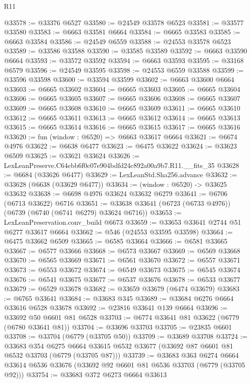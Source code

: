 \begin{lexlean}{R11}
\begin{coremodule}
@33578 := @33376 @6527
@33580 := @24549 @33578 @6523
@33581 := @33577 @33580
@33583 := @6663 @33581 @6664
@33584 := @6665 @33583
@33585 := @6663 @33584
@33586 := @24549 @6559
@33588 := @24553 @33578 @6523
@33589 := @33586 @33588
@33590 := @33585 @33589
@33592 := @6663 @33590 @6664
@33593 := @33572 @33592
@33594 := @6663 @33593
@33595 := @33168 @6579
@33596 := @24549 @33595
@33598 := @24553 @6559 @33588
@33599 := @33596 @33598
@33600 := @33594 @33599
@33602 := @6663 @33600 @6664
@33603 := @6665 @33602
@33604 := @6665 @33603
@33605 := @6665 @33604
@33606 := @6665 @33605
@33607 := @6665 @33606
@33608 := @6665 @33607
@33609 := @6665 @33608
@33610 := @6665 @33609
@33611 := @6665 @33610
@33612 := @6665 @33611
@33613 := @6665 @33612
@33614 := @6665 @33613
@33615 := @6665 @33614
@33616 := @6665 @33615
@33617 := @6665 @33616
@33620 := fun (window : @6520) => @6663 @33617 @6664
@33621 := @6674 @4976
@33622 := @6638 @6477
@33623 := @6475 @33622
@33624 := @33623 @6509
@33625 := @33621 @33624
@33626 := LexLeanPreserve.C64ebb6f0c07e904bdfd24c892a00a9b7.R11.__fits_35
@33628 := @6684 (@33626 @6477)
@33629 := LexLeanStd.Sha256.advance
@33632 := @33628 (@6638 (@33629 @6477))
@33634 := (window : @6520) -> @33625 @33632
@33638 := @6698 @4976 @33624 @33632 @6279
@33641 := @6706 (@6713 @33622) @6716
@33651 := @33638 @33641 (@6723 (@6733 @4976)) (@6739 (@6740 (@6741 @6279) @33624 @6716))
@33653 := LexLeanPreservation.conv_build @6673
@33659 := @33653 @33641 @2744 @51 @6277 @33617 @6664
@33662 := @546 (@24553 @33595 @33598)
@33664 := @6475 @33662 @6509
@33665 := @6585 @33664
@33666 := @6581 @33665
@33667 := @6577 @33666
@33668 := @6573 @33667
@33669 := @6569 @33668
@33670 := @6565 @33669
@33671 := @6561 @33670
@33672 := @6557 @33671
@33673 := @6553 @33672
@33674 := @6549 @33673
@33675 := @6545 @33674
@33676 := @6541 @33675
@33677 := @6537 @33676
@33678 := @6533 @33677
@33679 := @6529 @33678
@33682 := @33659 @33679 (@6474 @33679)
@33683 := @6765 @33641
@33684 := @33683 @345
@33689 := @33684 @6276 @6664 @33616 @6528 @33678
@33692 := @23816 @33641 @139 @6664
@33696 := @33692 @50 @6601 @81 @6528
@33703 := @6774 @33641 @81 @33622 (@6779 (@6780 @33641 @81))
@33704 := @33696 @33703
@33705 := @23835 @6601
@33708 := @33704 (@6779 (@33705 @50))
@33709 := @33689 @33708
@33724 := @33683
    @354
    @6275
    @6664
    @33615
    @6532
    @33677
    (@33692 @87 @6601 @81 @6532 @33703 (@6779 (@33705 @87)))
@33739 := @33683
    @363
    @6274
    @6664
    @33614
    @6536
    @33676
    (@33692 @92 @6601 @81 @6536 @33703 (@6779 (@33705 @92)))
@33754 := @33683
    @372
    @6273
    @6664
    @33613

\end{coremodule}
\end{lexlean}
